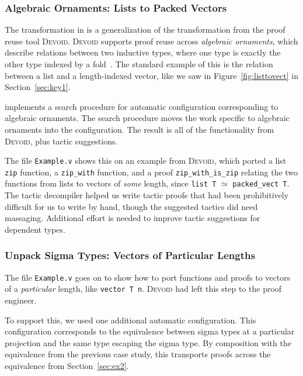 \subsubsection*{Algebraic Ornaments: Lists to Packed Vectors}

The transformation in \toolname is a generalization of the transformation from the proof reuse tool \textsc{Devoid}.
\textsc{Devoid} supports proof reuse across \textit{algebraic ornaments}, which describe relations
between two inductive types, where one type is exactly the other type indexed by a fold~\cite{mcbride}.
The standard example of this is the relation between a list and a
length-indexed vector, like we saw in Figure~\ref{fig:listtovect} in Section~\ref{sec:key1}.

\toolname implements a search procedure for automatic configuration corresponding to algebraic ornaments.
The search procedure moves the work specific to algebraic ornaments into the \toolname configuration.
The result is all of the functionality from \textsc{Devoid}, plus tactic suggestions.

The file \lstinline{Example.v} shows this on an example from \textsc{Devoid},
which ported a list \lstinline{zip} function,
a \lstinline{zip_with} function, and a proof \lstinline{zip_with_is_zip} relating the two
functions from lists to vectors of \textit{some} length, since \lstinline{list T} $\simeq$ \lstinline{packed_vect T}.
The tactic decompiler helped us write tactic proofs that had been
prohibitively difficult for us to write by hand,
though the suggested tactics did need massaging. %
Additional effort is needed to improve tactic suggestions for dependent types.

\subsubsection*{Unpack Sigma Types: Vectors of Particular Lengths}

The file \lstinline{Example.v} goes on to show how to port functions and proofs to vectors of a \textit{particular} length, 
like \lstinline{vector T n}.
\textsc{Devoid} had left this step to the proof engineer.

To support this, we used one additional automatic configuration.
This configuration corresponds to the equivalence between sigma types at a particular projection
and the same type escaping the sigma type. %
By composition with the equivalence from the previous case study, this transports proofs
across the equivalence from Section~\ref{sec:ex2}.

